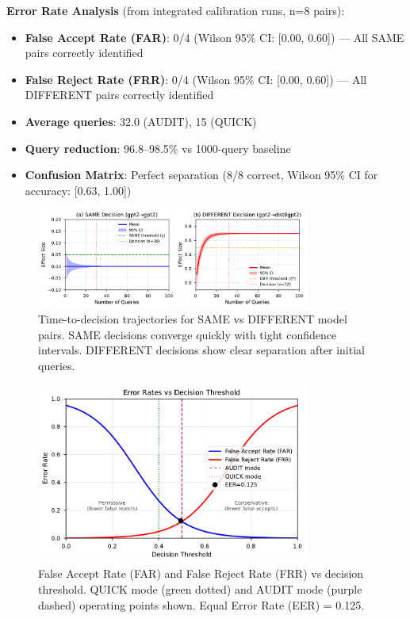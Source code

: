 \documentclass{article}
\begin{document}
\textbf{Error Rate Analysis} (from integrated calibration runs, n=8 pairs):
\begin{itemize}
\item \textbf{False Accept Rate (FAR)}: 0/4 (Wilson 95\% CI: [0.00, 0.60]) --- All SAME pairs correctly identified
\item \textbf{False Reject Rate (FRR)}: 0/4 (Wilson 95\% CI: [0.00, 0.60]) --- All DIFFERENT pairs correctly identified  
\item \textbf{Average queries}: 32.0 (AUDIT), 15 (QUICK)  
\item \textbf{Query reduction}: 96.8--98.5\% vs 1000-query baseline
\item \textbf{Confusion Matrix}: Perfect separation (8/8 correct, Wilson 95\% CI for accuracy: [0.63, 1.00])
\end{itemize}

\begin{figure}[h]
\centering
\includegraphics[width=0.8\textwidth]{figures/fig1_time_to_decision.pdf}
\caption{Time-to-decision trajectories for SAME vs DIFFERENT model pairs. SAME decisions converge quickly with tight confidence intervals. DIFFERENT decisions show clear separation after initial queries.}
\label{fig:time-to-decision}
\end{figure}

\begin{figure}[h]
\centering
\includegraphics[width=0.8\textwidth]{figures/fig2_error_rates.pdf}
\caption{False Accept Rate (FAR) and False Reject Rate (FRR) vs decision threshold. QUICK mode (green dotted) and AUDIT mode (purple dashed) operating points shown. Equal Error Rate (EER) = 0.125.}
\label{fig:error-rates}
\end{figure}
\end{document}
